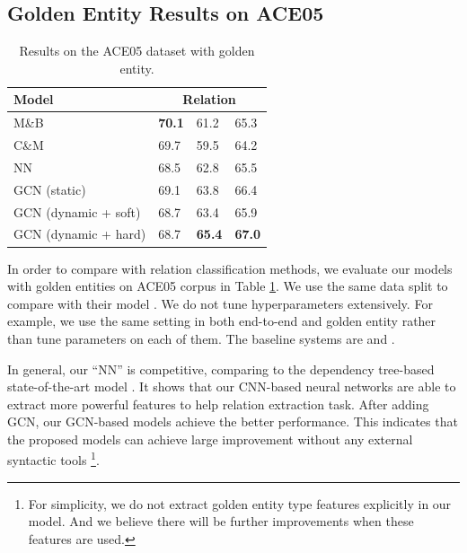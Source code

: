 \subsection{Golden Entity Results on ACE05}
\begin{table}
	\centering
	\footnotesize
	\begin{tabular}{l|lll}
		\toprule
		\textbf{Model} & \multicolumn{3}{c}{\textbf{Relation}} \\
        \midrule
        M\&B \citeyearpar{miwa-bansal:2016:P16-1}  & \textbf{70.1} & 61.2 & 65.3  \\
        C\&M \citeyearpar{P18-2014} & 69.7 & 59.5 & 64.2 \\
        NN & 68.5 & 62.8 & 65.5 \\
     
        GCN (static) & 69.1 & 63.8 & 66.4 \\
        GCN (dynamic + soft)& 68.7 & 63.4 & 65.9 \\
        GCN (dynamic + hard)& 68.7 & \textbf{65.4} & \textbf{67.0}  \\
		\bottomrule
	\end{tabular}
	\caption{\small Results on the ACE05 dataset with golden entity.}
	\label{tab:ace-gold-entity}
\end{table}


In order to compare with relation classification methods,
we evaluate our models with golden entities on ACE05 corpus in Table \ref{tab:ace-gold-entity}.
We use the same data split to compare with their model \cite{miwa-bansal:2016:P16-1,P18-2014}.
We do not tune hyperparameters extensively. 
For example, we use the same setting in both end-to-end and golden entity
rather than tune parameters on each of them.
The baseline systems are \cite{miwa-bansal:2016:P16-1} and \cite{P18-2014}.

In general, 
our ``NN''  is competitive,
comparing to the dependency tree-based state-of-the-art model \cite{miwa-bansal:2016:P16-1}.
It shows that our CNN-based neural networks are able to extract
more powerful features to help relation extraction task.
After adding GCN,
our GCN-based models achieve the better performance.
This indicates that the proposed models can
achieve large improvement without any external syntactic tools
\footnote{For simplicity, we do not extract golden entity type features explicitly in our model.
And we believe there will be further improvements when these features are used.
}.

